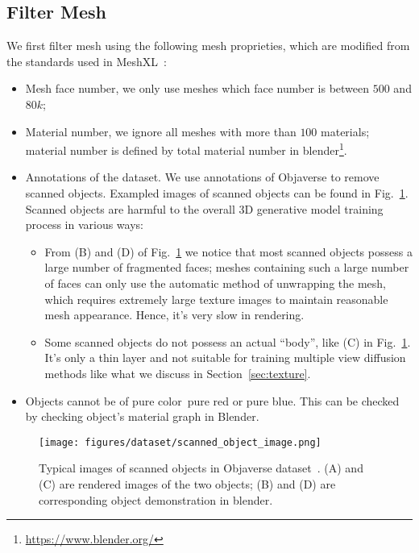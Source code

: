 \subsection{Filter Mesh}
\label{sec:datasets:preprocess:filter}
We first filter mesh using the following mesh proprieties, which are modified from the standards used in MeshXL~\cite{chen2024meshxl}:
\begin{itemize}
    \item Mesh face number, we only use meshes which face number is between $500$ and $80k$;
    \item Material number, we ignore all meshes with more than $100$ materials; material number is defined by total material number in blender\footnote{\url{https://www.blender.org/}}.
    \item Annotations of the dataset. We use annotations of Objaverse to remove scanned objects. Exampled images of scanned objects can be found in Fig.~\ref{fig:dataset:2}.
    Scanned objects are harmful to the overall 3D generative model training process in various ways:
    \begin{itemize}
        \item From (B) and (D) of Fig.~\ref{fig:dataset:2} we notice that most scanned objects possess a large number of fragmented faces;
        meshes containing such a large number of faces can only use the automatic method of unwrapping the mesh, which requires extremely large texture images to maintain reasonable mesh appearance. Hence, it's very slow in rendering.
        \item Some scanned objects do not possess an actual ``body'', like (C) in Fig.~\ref{fig:dataset:2}. 
        It's only a thin layer and not suitable for training multiple view diffusion methods like what we discuss in Section~\ref{sec:texture}.
    \end{itemize}
    \item Objects cannot be of pure color~\ie pure red or pure blue. This can be checked by checking object's material graph in Blender.
\end{itemize}

\begin{figure}
    \centering 

    \texttt{[image: figures/dataset/scanned\_object\_image.png]}
    \caption[Scanned objects.]
    {Typical images of scanned objects in Objaverse dataset~\cite{deitke2023objaverse}. 
    (A) and (C) are rendered images of the two objects; 
    (B) and (D) are corresponding object demonstration in blender.}
    \label{fig:dataset:2}
\end{figure}



